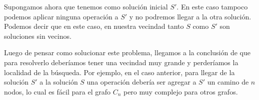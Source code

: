 Supongamos ahora que tenemos como solución inicial $S'$. En este caso tampoco podemos aplicar ninguna operación a $S'$ y no podremos llegar a la otra solución. Podemos decir que en este caso, en nuestra vecindad tanto $S$ como $S'$ son soluciones sin vecinos.

Luego de pensar como solucionar este problema, llegamos a la conclusión de que para resolverlo deberíamos tener una vecindad muy grande y perderíamos la localidad de la búsqueda. Por ejemplo, en el caso anterior, para llegar de la solución $S'$ a la solución $S$ una operación debería ser agregar a $S'$ un camino de $n$ nodos, lo cual es fácil para el grafo $C_n$ pero muy complejo para otros grafos.
